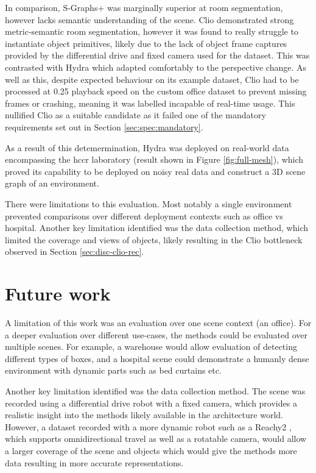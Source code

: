 In comparison, S-Graphs+ was marginally superior at room segmentation, however lacks semantic understanding of the scene. Clio demonstrated strong metric-semantic room segmentation, however it was found to really struggle to instantiate object primitives, likely due to the lack of object frame captures provided by the differential drive and fixed camera used for the dataset. This was contrasted with Hydra which adapted comfortably to the perspective change. As well as this, despite expected behaviour on its example dataset, Clio had to be processed at 0.25 playback speed on the custom office dataset to prevent missing frames or crashing, meaning it was labelled incapable of real-time usage. This nullified Clio as a suitable candidate as it failed one of the mandatory requirements set out in Section \ref{sec:spec:mandatory}.

As a result of this detemermination, Hydra was deployed on real-world data encompassing the \gls{hccr} laboratory (result shown in Figure \ref{fig:full-mesh}), which proved its capability to be deployed on noisy real data and construct a 3D scene graph of an environment.

There were limitations to this evaluation. Most notably a single environment prevented comparisons over different deployment contexts such as office vs hospital. Another key limitation identified was the data collection method, which limited the coverage and views of objects, likely resulting in the Clio bottleneck observed in Section \ref{sec:disc-clio-rec}.


\section{Future work}\label{sec:future}

A limitation of this work was an evaluation over one scene context (an office). For a deeper evaluation over different use-cases, the methods could be evaluated over multiple scenes. For example, a warehouse would allow evaluation of detecting different types of boxes, and a hospital scene could demonstrate a humanly dense environment with dynamic parts such as bed curtains etc.

Another key limitation identified was the data collection method. The scene was recorded using a differential drive robot with a fixed camera, which provides a realistic insight into the methods likely available in the architecture world. However, a dataset recorded with a more dynamic robot such as a Reachy2 \cite{Reachy2}, which supports omnidirectional travel as well as a rotatable camera, would allow a larger coverage of the scene and objects which would give the methods more data resulting in more accurate representations.

